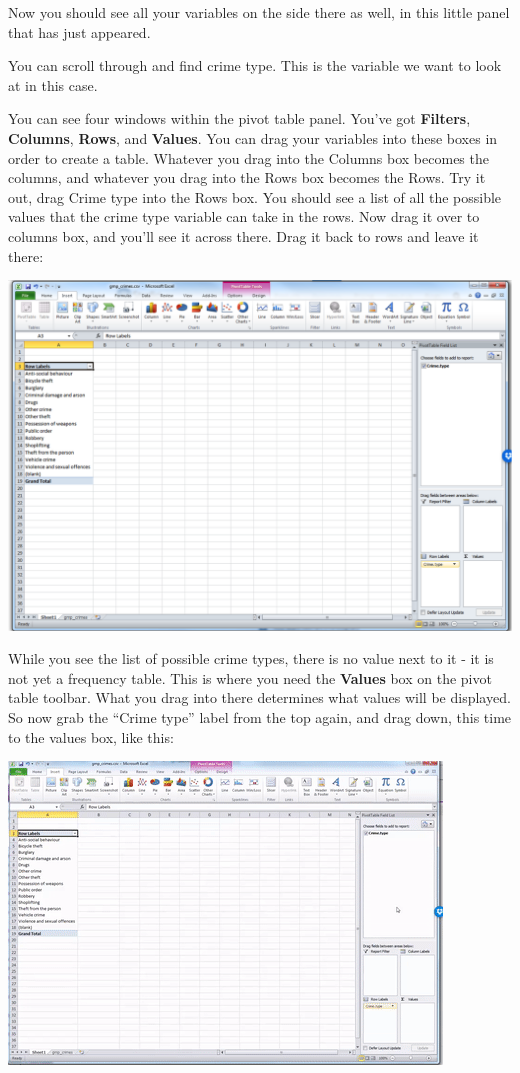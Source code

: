 \documentclass[]{book}
\theoremstyle{definition}
\theoremstyle{definition}
\theoremstyle{definition}
\theoremstyle{remark}
\begin{document}
Now you should see all your variables on the side there as well, in this
little panel that has just appeared.

You can scroll through and find crime type. This is the variable we want
to look at in this case.

You can see four windows within the pivot table panel. You've got
\textbf{Filters}, \textbf{Columns}, \textbf{Rows}, and \textbf{Values}.
You can drag your variables into these boxes in order to create a table.
Whatever you drag into the Columns box becomes the columns, and whatever
you drag into the Rows box becomes the Rows. Try it out, drag Crime type
into the Rows box. You should see a list of all the possible values that
the crime type variable can take in the rows. Now drag it over to
columns box, and you'll see it across there. Drag it back to rows and
leave it there:

\includegraphics{imgs/ct_in_rows.png}

While you see the list of possible crime types, there is no value next
to it - it is not yet a frequency table. This is where you need the
\textbf{Values} box on the pivot table toolbar. What you drag into there
determines what values will be displayed. So now grab the ``Crime type''
label from the top again, and drag down, this time to the values box,
like this:

\includegraphics{imgs/ct_in_values.gif}
\end{document}

